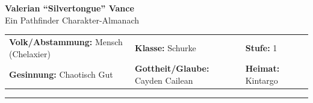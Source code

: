 \documentclass[10pt,a4paper]{article}
\begin{document}
\begin{center}
    {\Huge\bfseries\sffamily Valerian \enquote{Silvertongue} Vance} \\[0.2cm]
    {\large Ein Pathfinder Charakter-Almanach}
\end{center}

\vspace{0.3cm}

\noindent
\begin{tabular*}{\textwidth}{@{\extracolsep{\fill}}llll}
    \textbf{Volk/Abstammung:} Mensch (Chelaxier) & \textbf{Klasse:} Schurke & \textbf{Stufe:} 1 \\
    \textbf{Gesinnung:} Chaotisch Gut & \textbf{Gottheit/Glaube:} Cayden Cailean & \textbf{Heimat:} Kintargo \\
\end{tabular*}

\vfill
\hrule
\vfill
\end{document}
